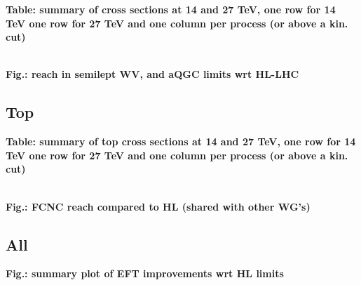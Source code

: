 \documentclass{article}
\begin{document}
{\bf Table: summary of cross sections at 14 and 27 TeV, one row for 14 TeV one row for 27 TeV and one column per process (or above a kin. cut) }



\\
{\bf Fig.: reach in semilept WV, and aQGC limits wrt HL-LHC}



\subsection{Top}

{\bf Table: summary of top cross sections at 14 and 27 TeV, one row for 14 TeV one row for 27 TeV and one column per process (or above a kin. cut) }



\\
{\bf Fig.: FCNC reach compared to HL (shared with other WG's)}


\subsection{All}

{\bf Fig.: summary plot of EFT improvements wrt HL limits}


{}
\end{document}
